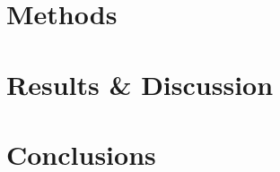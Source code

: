 \documentclass[a4paper, 11pt]{report}
\begin{document}
\chapter{Methods}


\chapter{Results \& Discussion}


\chapter{Conclusions}



\clearpage

\printbibliography

\clearpage


\begin{appendices}
  
\end{appendices}













\end{document}
